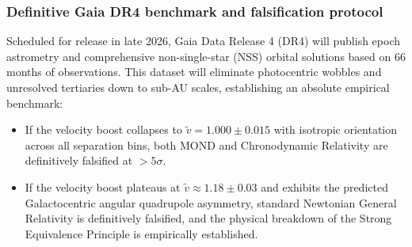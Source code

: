 \documentclass[aps,prd,reprint,superscriptaddress,nofootinbib,floatfix,amsmath,amssymb]{revtex4-2}
\begin{document}
\subsubsection{Definitive Gaia DR4 benchmark and falsification protocol}
Scheduled for release in late 2026, Gaia Data Release 4 (DR4) will publish epoch astrometry and comprehensive non-single-star (NSS) orbital solutions based on 66 months of observations. This dataset will eliminate photocentric wobbles and unresolved tertiaries down to sub-AU scales, establishing an absolute empirical benchmark:
\begin{itemize}
\item If the velocity boost collapses to $\tilde{v} = 1.000 \pm 0.015$ with isotropic orientation across all separation bins, both MOND and Chronodynamic Relativity are definitively falsified at $>5\sigma$.
\item If the velocity boost plateaus at $\tilde{v} \approx 1.18 \pm 0.03$ and exhibits the predicted Galactocentric angular quadrupole asymmetry, standard Newtonian General Relativity is definitively falsified, and the physical breakdown of the Strong Equivalence Principle is empirically established.
\end{itemize}
\end{document}
